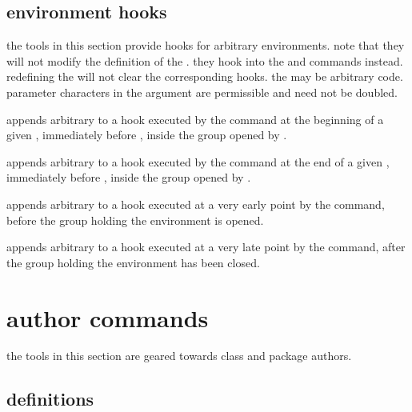 \subsection[environment hooks]{environment hooks}
\label{use:env}

the tools in this section provide hooks for arbitrary environments. note that they will not modify the definition of the . they hook into the  and  commands instead. redefining the  will not clear the corresponding hooks. the  may be arbitrary \tex code. parameter characters in the  argument are permissible and need not be doubled.

\begin{ltxsyntax}


appends arbitrary  to a hook executed by the  command at the beginning of a given , immediately before , inside the group opened by .


appends arbitrary  to a hook executed by the  command at the end of a given , immediately before , inside the group opened by .


appends arbitrary  to a hook executed at a very early point by the  command, before the group holding the environment is opened.


appends arbitrary  to a hook executed at a very late point by the  command, after the group holding the environment has been closed.

\end{ltxsyntax}

\section{author commands}

the tools in this section are geared towards class and package authors.

\subsection{definitions}

